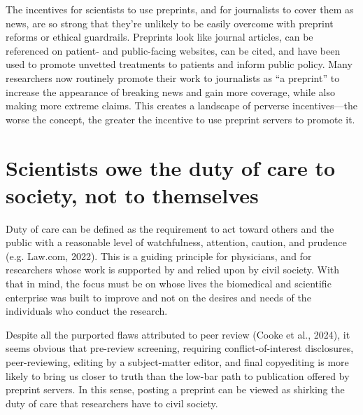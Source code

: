 \documentclass[authordate, empirical]{jote-new-article}
\begin{document}
	The incentives for scientists to use preprints, and for journalists to cover them as news, are so strong that they're unlikely to be easily overcome with preprint reforms or ethical guardrails. Preprints look like journal articles, can be referenced on patient- and public-facing websites, can be cited, and have been used to promote unvetted treatments to patients and inform public policy. Many researchers now routinely promote their work to journalists as “a preprint” to increase the appearance of breaking news and gain more coverage, while also making more extreme claims. This creates a landscape of perverse incentives—the worse the concept, the greater the incentive to use preprint servers to promote it.







	\section{Scientists owe the duty of care to society, not to themselves}







	Duty of care can be defined as the requirement to act toward others and the public with a reasonable level of watchfulness, attention, caution, and prudence (e.g. Law.com, 2022). This is a guiding principle for physicians, and for researchers whose work is supported by and relied upon by civil society. With that in mind, the focus must be on whose lives the biomedical and scientific enterprise was built to improve and not on the desires and needs of the individuals who conduct the research.







	Despite all the purported flaws attributed to peer review (Cooke et al., 2024), it seems obvious that pre-review screening, requiring conflict-of-interest disclosures, peer-reviewing, editing by a subject-matter editor, and final copyediting is more likely to bring us closer to truth than the low-bar path to publication offered by preprint servers. In this sense, posting a preprint can be viewed as shirking the duty of care that researchers have to civil society.
\end{document}
